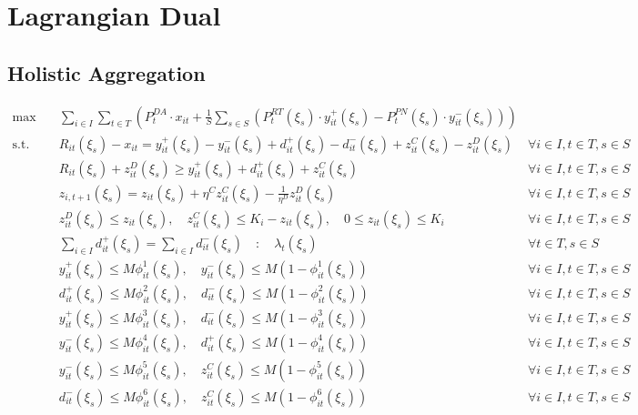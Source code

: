 \documentclass[10pt]{article}
\begin{document}
\section{Lagrangian Dual}

\subsection{Holistic Aggregation}

\begin{subequations}\label{eq:holistic_model}
   \begin{align}
       \text{max} \quad &\sum_{i\in I}\sum_{t\in T}\left(P_t^{DA} \cdot x_{it} + \frac{1}{S}\sum_{s \in S}\left(P_t^{RT}(\xi_s) \cdot y^+_{it}(\xi_s) - P_t^{PN}(\xi_s) \cdot y^-_{it}(\xi_s)\right) \right) \label{eq:objective}\\   
       \text{s.t.} \quad 
       & R_{it}(\xi_s) - x_{it} = y_{it}^{+}(\xi_s) - y_{it}^{-}(\xi_s) + d^+_{it}(\xi_s) - d^-_{it}(\xi_s) + z^C_{it}(\xi_s) - z^D_{it}(\xi_s) & \forall i \in I, t \in T, s \in S \label{eq:energy_balance}\\
       & R_{it}(\xi_s) + z^D_{it}(\xi_s) \geq y^+_{it}(\xi_s) + d^+_{it}(\xi_s) + z^C_{it}(\xi_s) & \forall i \in I, t \in T, s \in S \label{eq:feasibility}\\
       & z_{i,t+1}(\xi_s) = z_{it}(\xi_s) + \eta^C z^C_{it}(\xi_s) - \frac{1}{\eta^D} z^D_{it}(\xi_s) & \forall i \in I, t \in T, s \in S \label{eq:battery_dynamics}\\
       & z^D_{it}(\xi_s) \le z_{it}(\xi_s), \quad z^C_{it}(\xi_s) \le K_i - z_{it}(\xi_s), \quad 0 \leq z_{it}(\xi_s) \leq K_i & \forall i \in I, t \in T, s \in S \label{eq:battery_limits}\\
       & \sum_{i \in I} d^+_{it}(\xi_s) = \sum_{i \in I} d^-_{it}(\xi_s) \quad : \quad \lambda_t(\xi_s) & \forall t \in T, s \in S \label{eq:balance_constraint}\\
       & y^+_{it}(\xi_s) \leq M \phi^1_{it}(\xi_s), \quad y^-_{it}(\xi_s) \leq M (1 - \phi^1_{it}(\xi_s)) & \forall i \in I, t \in T, s \in S \label{eq:arb1}\\
       & d^+_{it}(\xi_s) \leq M \phi^2_{it}(\xi_s), \quad d^-_{it}(\xi_s) \leq M (1 - \phi^2_{it}(\xi_s)) & \forall i \in I, t \in T, s \in S \label{eq:arb2}\\
       & y^+_{it}(\xi_s) \leq M \phi^3_{it}(\xi_s), \quad d^-_{it}(\xi_s) \leq M (1 - \phi^3_{it}(\xi_s)) & \forall i \in I, t \in T, s \in S \label{eq:arb3}\\
       & y^-_{it}(\xi_s) \leq M \phi^4_{it}(\xi_s), \quad d^+_{it}(\xi_s) \leq M (1 - \phi^4_{it}(\xi_s)) & \forall i \in I, t \in T, s \in S \label{eq:arb4}\\
       & y^-_{it}(\xi_s) \leq M \phi^5_{it}(\xi_s), \quad z^C_{it}(\xi_s) \leq M (1 - \phi^5_{it}(\xi_s)) & \forall i \in I, t \in T, s \in S \label{eq:arb5}\\
       & d^-_{it}(\xi_s) \leq M \phi^6_{it}(\xi_s), \quad z^C_{it}(\xi_s) \leq M (1 - \phi^6_{it}(\xi_s)) & \forall i \in I, t \in T, s \in S \label{eq:arb6}
   \end{align}
\end{subequations}
\end{document}

